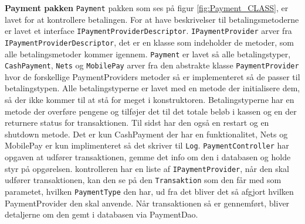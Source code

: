 \textbf{Payment pakken}
\newline
\texttt{Payment} pakken som ses på figur \ref{fig:Payment_CLASS}, er lavet for at kontrollere betalingen. For at have beskrivelser til betalingsmetoderne  er lavet et interface \texttt{IPaymentProviderDescriptor}. \texttt{IPaymentProvider} arver fra \texttt{IPaymentProviderDescriptor}, det er en klasse som indeholder de metoder, som alle betalingsmetoder kommer igennem. \texttt{Payment} er lavet så alle betalingstyper, \texttt{CashPayment}, \texttt{Nets} og \texttt{MobilePay} arver fra den abstrakte klasse \texttt{PaymentProvider} hvor de forskellige PaymentProviders metoder så er implementeret så de passer til betalingstypen. 
\newline
\newline
Alle betalingstyperne er lavet med en metode der initialisere dem, så der ikke kommer til at stå for meget i konstruktoren. Betalingstyperne har en metode der overføre pengene og tilføjer det til det totale beløb i kassen og en der returnere status for transaktionen. Til sidst har den også en restart og en shutdown metode. Det er kun CashPayment der har en funktionalitet, Nets og MobilePay er kun implimenteret så det skriver til \texttt{Log}.  
\newline
\newline
\texttt{PaymentController} har opgaven at udfører transaktionen, gemme det info om den i databasen og holde styr på opgørelsen. kontrolleren har en liste af \texttt{IPaymentProvider}, når den skal udfører transaktionen, kan den se på den \texttt{Transaktion} som den får med som parametet, hvilken \texttt{PaymentType} den har, ud fra det bliver det så afgjort hvilken PaymentProvider den skal anvende. Når transaktionen så er gennemført, bliver detaljerne om den gemt i databasen via PaymentDao. 

